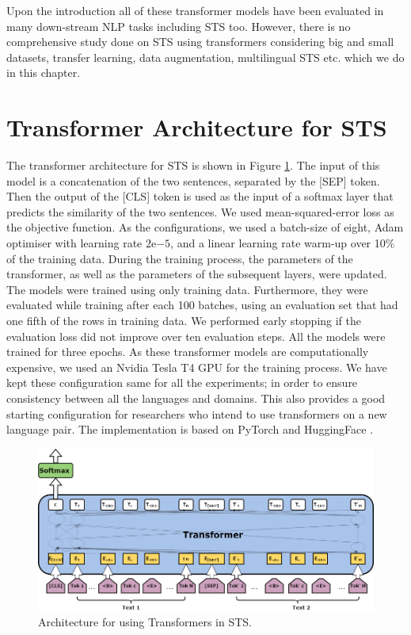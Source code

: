 Upon the introduction all of these transformer models have been evaluated in many down-stream NLP tasks including STS too. However, there is no comprehensive study done on STS using transformers considering big and small datasets, transfer learning, data augmentation, multilingual STS etc. which we do in this chapter.

\section{Transformer Architecture for STS}

The transformer architecture for STS is shown in Figure \ref{fig:sts_transformers}. The input of this model is a concatenation of the two sentences, separated by the \textsc{[SEP]} token. Then the output of the \textsc{[CLS]} token is used as the input of a softmax layer that predicts the similarity of the two sentences. We used mean-squared-error loss as the objective function. As the configurations, we used a batch-size of eight, Adam optimiser with learning rate $2\mathrm{e}{-5}$, and a linear learning rate warm-up over 10\% of the training data. During the training process, the parameters of the transformer, as well as the parameters of the subsequent layers, were updated. The models were trained using only training data. Furthermore, they were evaluated while training after each 100 batches, using an evaluation set that had one fifth of the rows in training data. We performed early stopping if the evaluation loss did not improve over ten evaluation steps. All the models were trained for three epochs. As these transformer models are computationally expensive, we used an Nvidia Tesla T4 GPU for the training process. We have kept these configuration same for all the experiments; in order to ensure consistency between all the languages and domains. This also provides a good starting configuration for researchers who intend to use transformers on a new language pair. The implementation is based on PyTorch \cite{NEURIPS2019_9015} and HuggingFace \cite{wolf-etal-2020-transformers}.

\begin{figure}[ht]
	\centering
	\includegraphics[scale=0.4]{figures/semantic_textual_similarity/transformers/STSTransformers.png}
	\caption[Architecture for using Transformers in STS]{Architecture for using Transformers in STS.}
	\label{fig:sts_transformers}
\end{figure}

